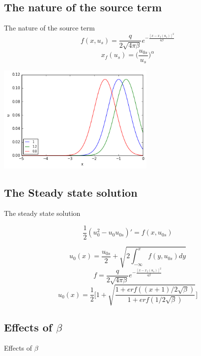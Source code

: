 \documentclass{beamer}
\begin{document}
	
\subsection{The nature of the source term}
\begin{frame}{The nature of the source term}
	\[f(x,u_{s})= \frac{q}{2\sqrt{4\pi \beta}} e^{-\frac{[x-x_f(u_s)]^2}{4\beta}}\]
	\[x_f(u_s) = \bigg(\frac{u_{0s}}{u_{s}}\bigg)^\alpha\]

  \begin{center}
  	\includegraphics[height=150pt]{shiftinit}\\
  	
  \end{center}

\end{frame}	

\subsection{The Steady state solution}
\begin{frame}{The steady state solution}
	
	
	\[\frac{1}{2}(u_0^2-u_0u_{0s})' =f(x,u_{0s}) \]
	
	\[u_0(x)=\frac{u_{0s}}{2}+ \sqrt{2\int_{-\infty}^{x}f(y,u_{0s})dy}\]
	\[f= \frac{q}{2\sqrt{4\pi \beta}} e^{-\frac{[x-x_f(u_s)]^2}{4\beta}}\]
	\[u_0(x)= \frac{1}{2}\bigg[1+ \sqrt{\frac{1+erf((x+1)/2\sqrt{\beta})}{1+erf(1/2\sqrt{\beta})}}\bigg]\]
	
\end{frame}
	
\subsection{Effects of $\beta$}
\begin{frame}{Effects of $\beta$}

	
\end{frame}	
\end{document}
